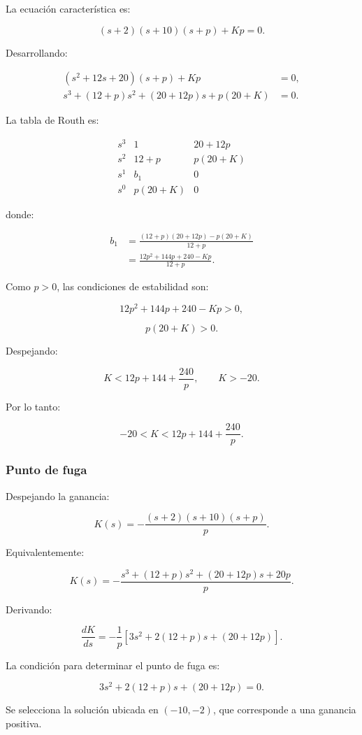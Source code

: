 \documentclass[12pt,a4paper]{article}
\begin{document}
La ecuación característica es:

\[
(s+2)(s+10)(s+p)+Kp=0.
\]

Desarrollando:

\begin{align*}
(s^2+12s+20)(s+p)+Kp&=0,\\
s^3+(12+p)s^2+(20+12p)s+p(20+K)&=0.
\end{align*}

La tabla de Routh es:

\[
\begin{array}{c|cc}
s^3 & 1       & 20+12p\\
s^2 & 12+p    & p(20+K)\\
s^1 & b_1     & 0\\
s^0 & p(20+K) & 0
\end{array}
\]

donde:

\begin{align*}
b_1
&=
\frac{
(12+p)(20+12p)-p(20+K)
}{
12+p
}\\
&=
\frac{
12p^2+144p+240-Kp
}{
12+p
}.
\end{align*}

Como $p>0$, las condiciones de estabilidad son:

\[
12p^2+144p+240-Kp>0,
\]

\[
p(20+K)>0.
\]

Despejando:

\[
K<12p+144+\frac{240}{p},
\qquad
K>-20.
\]

Por lo tanto:

\[
\boxed{
-20<K<12p+144+\frac{240}{p}.
}
\]


\subsubsection*{Punto de fuga}

Despejando la ganancia:

\[
K(s)
=
-\frac{(s+2)(s+10)(s+p)}{p}.
\]

Equivalentemente:

\[
K(s)
=
-\frac{
s^3+(12+p)s^2+(20+12p)s+20p
}{p}.
\]

Derivando:

\[
\frac{dK}{ds}
=
-\frac{1}{p}
\left[
3s^2+2(12+p)s+(20+12p)
\right].
\]

La condición para determinar el punto de fuga es:

\[
\boxed{
3s^2+2(12+p)s+(20+12p)=0.
}
\]

Se selecciona la solución ubicada en $(-10,-2)$,
que corresponde a una ganancia positiva.
\end{document}
